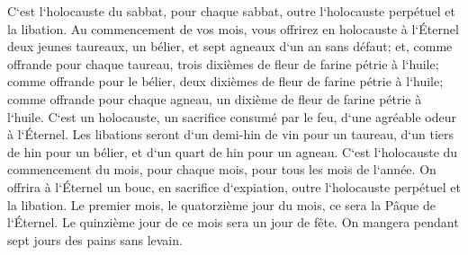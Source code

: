 \verse C`est l`holocauste du sabbat, pour chaque sabbat, outre l`holocauste perpétuel et la libation. 
\verse Au commencement de vos mois, vous offrirez en holocauste à l`Éternel deux jeunes taureaux, un bélier, et sept agneaux d`un an sans défaut; 
\verse et, comme offrande pour chaque taureau, trois dixièmes de fleur de farine pétrie à l`huile; comme offrande pour le bélier, deux dixièmes de fleur de farine pétrie à l`huile; 
\verse comme offrande pour chaque agneau, un dixième de fleur de farine pétrie à l`huile. C`est un holocauste, un sacrifice consumé par le feu, d`une agréable odeur à l`Éternel. 
\verse Les libations seront d`un demi-hin de vin pour un taureau, d`un tiers de hin pour un bélier, et d`un quart de hin pour un agneau. C`est l`holocauste du commencement du mois, pour chaque mois, pour tous les mois de l`année. 
\verse On offrira à l`Éternel un bouc, en sacrifice d`expiation, outre l`holocauste perpétuel et la libation. 
\verse Le premier mois, le quatorzième jour du mois, ce sera la Pâque de l`Éternel. 
\verse Le quinzième jour de ce mois sera un jour de fête. On mangera pendant sept jours des pains sans levain. 
